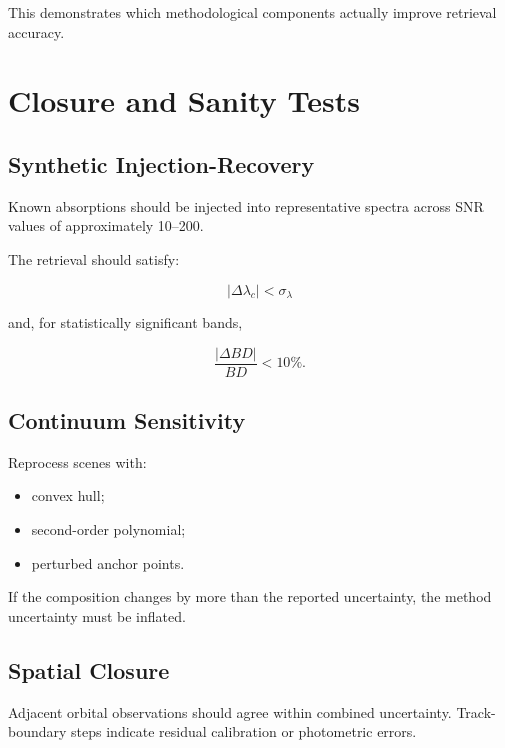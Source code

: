 \documentclass[11pt,a4paper]{article}
\begin{document}
This demonstrates which methodological components actually improve retrieval accuracy.

\section{Closure and Sanity Tests}

\subsection{Synthetic Injection-Recovery}

Known absorptions should be injected into representative spectra across SNR values of approximately 10--200.

The retrieval should satisfy:

\begin{equation}
|\Delta\lambda_c|
<
\sigma_{\lambda}
\end{equation}

and, for statistically significant bands,

\begin{equation}
\frac{
|\Delta BD|
}{
BD
}
<
10\%.
\end{equation}

\subsection{Continuum Sensitivity}

Reprocess scenes with:

\begin{itemize}
    \item convex hull;
    \item second-order polynomial;
    \item perturbed anchor points.
\end{itemize}

If the composition changes by more than the reported uncertainty, the method uncertainty must be inflated.

\subsection{Spatial Closure}

Adjacent orbital observations should agree within combined uncertainty. Track-boundary steps indicate residual calibration or photometric errors.
\end{document}
